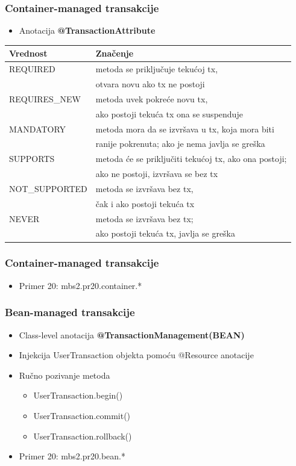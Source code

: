 \documentclass[compress]{beamer}
\begin{document}
\begin{frame}
  \frametitle{Container-managed transakcije}
  \begin{itemize}
    \item Anotacija {\bf @TransactionAttribute}
  \end{itemize}
  \small{
  \begin{tabular}{l|l}
    \textbf{Vrednost} & \textbf{Značenje} \\ \hline
    REQUIRED & metoda se priključuje tekućoj tx, \\
      & otvara novu ako tx ne postoji \\ \hline
    REQUIRES\_NEW & metoda uvek pokreće novu tx, \\
      & ako postoji tekuća tx ona se suspenduje \\ \hline
    MANDATORY & metoda mora da se izvršava u tx, koja mora biti \\
      & ranije pokrenuta; ako je nema javlja se greška \\ \hline
    SUPPORTS & metoda će se priključiti tekućoj tx, ako ona postoji; \\ 
      & ako ne postoji, izvršava se bez tx \\ \hline
    NOT\_SUPPORTED & metoda se izvršava bez tx, \\ 
      & čak i ako postoji tekuća tx \\ \hline
    NEVER & metoda se izvršava bez tx; \\
      & ako postoji tekuća tx, javlja se greška
  \end{tabular}
  }
\end{frame}
\begin{frame}
  \frametitle{Container-managed transakcije}
  \begin{itemize}
    \item Primer 20: mbs2.pr20.container.*
  \end{itemize}
\end{frame}
\begin{frame}
  \frametitle{Bean-managed transakcije}
  \begin{itemize}
    \item Class-level anotacija \textbf{@TransactionManagement(BEAN)}
    \item Injekcija UserTransaction objekta pomoću @Resource anotacije
    \item Ručno pozivanje metoda
    \begin{itemize}
      \item UserTransaction.begin()
      \item UserTransaction.commit()
      \item UserTransaction.rollback()
    \end{itemize}
    \item Primer 20: mbs2.pr20.bean.*
  \end{itemize}
\end{frame}
\end{document}
